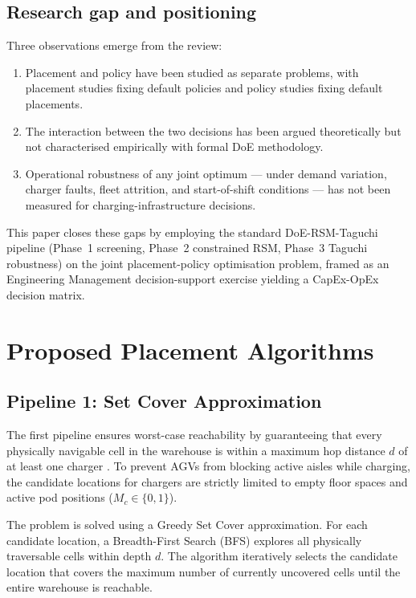 \documentclass[conference]{IEEEtran}
\begin{document}
\subsection{Research gap and positioning}

Three observations emerge from the review:

\begin{enumerate}
  \item Placement and policy have been studied as separate problems, with placement studies fixing default policies and policy studies fixing default placements.
  \item The interaction between the two decisions has been argued theoretically \cite{pfrommer2020} but not characterised empirically with formal DoE methodology.
  \item Operational robustness of any joint optimum --- under demand variation, charger faults, fleet attrition, and start-of-shift conditions --- has not been measured for charging-infrastructure decisions.
\end{enumerate}

This paper closes these gaps by employing the standard DoE-RSM-Taguchi pipeline (Phase~1 screening, Phase~2 constrained RSM, Phase~3 Taguchi robustness) on the joint placement-policy optimisation problem, framed as an Engineering Management decision-support exercise yielding a CapEx-OpEx decision matrix.

\section{Proposed Placement Algorithms}
\label{sec:placement}

\subsection{Pipeline 1: Set Cover Approximation}
The first pipeline ensures worst-case reachability by guaranteeing that every physically navigable cell in the warehouse is within a maximum hop distance $d$ of at least one charger \cite{kundu2023}. To prevent AGVs from blocking active aisles while charging, the candidate locations for chargers are strictly limited to empty floor spaces and active pod positions ($M_c \in \{0, 1\}$).

The problem is solved using a Greedy Set Cover approximation. For each candidate location, a Breadth-First Search (BFS) explores all physically traversable cells within depth $d$. The algorithm iteratively selects the candidate location that covers the maximum number of currently uncovered cells until the entire warehouse is reachable.
\end{document}
